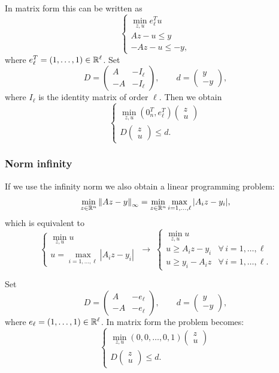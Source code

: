 In matrix form this can be written as
\[
\begin{cases}
\displaystyle \min_{z,u} e_\ell^T u\\
Az - u \le y\\
-Az - u \le -y,
\end{cases}
\]
where $e_\ell^T = (1,\dots,1) \in \mathbb{R}^\ell$. Set
\[
D = \begin{pmatrix} A & -I_\ell\\ -A & -I_\ell \end{pmatrix},
\qquad
d = \begin{pmatrix} y\\ -y \end{pmatrix},
\]
where $I_\ell$ is the identity matrix of order $\ell$. Then we obtain
\[
\begin{cases}
\displaystyle \min_{z,u} (0_n^T, e_\ell^T)\begin{pmatrix} z\\ u \end{pmatrix}\\[1ex]
D \begin{pmatrix} z\\ u \end{pmatrix} \le d.
\end{cases}
\]

\subsubsection{Norm infinity}

If we use the infinity norm we also obtain a linear programming problem:
\[
\min_{z \in \mathbb{R}^n} \left\lVert Az-y \right\rVert_\infty = \min_{z \in \mathbb{R}^n} \max_{i=1,\dots,\ell} |A_i z - y_i|,
\]
which is equivalent to
\[
\begin{cases}
\displaystyle \min_{z,u} u\\[1ex]
u = \displaystyle\max_{i=1,\dots,\ell} |A_i z - y_i|
\end{cases}
\;\to\;
\begin{cases}
\displaystyle \min_{z,u} u\\[1ex]
u \ge A_i z - y_i & \forall\, i=1,\dots,\ell\\
u \ge y_i - A_i z & \forall\, i=1,\dots,\ell.
\end{cases}
\]

Set
\[
D = \begin{pmatrix} A & -e_\ell\\ -A & -e_\ell \end{pmatrix},
\qquad
d = \begin{pmatrix} y\\ -y \end{pmatrix},
\]
where $e_\ell = (1,\dots,1) \in \mathbb{R}^\ell$. In matrix form the problem becomes:
\[
\begin{cases}
\displaystyle \min_{z,u} (0,0,\dots,0,1)\begin{pmatrix} z\\ u \end{pmatrix}\\[1ex]
D \begin{pmatrix} z\\ u \end{pmatrix} \le d.
\end{cases}
\]

